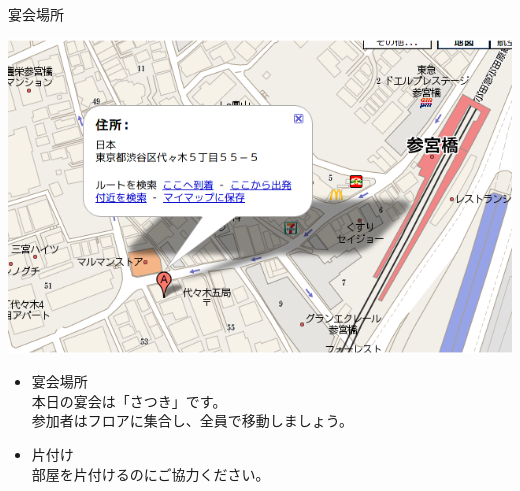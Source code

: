 \documentclass[cjk,dvipdfmx,12pt]{beamer}
\begin{document}
\begin{frame}{宴会場所}
\begin{center}
 \includegraphics[width=0.7\hsize]{image200806/satsuki.png}
\end{center}

\begin{itemize}
 \item 宴会場所\\
       本日の宴会は「さつき」です。\\
       参加者はフロアに集合し、全員で移動しましょう。
 \item 片付け\\
       部屋を片付けるのにご協力ください。
\end{itemize}

\end{frame}
\end{document}
